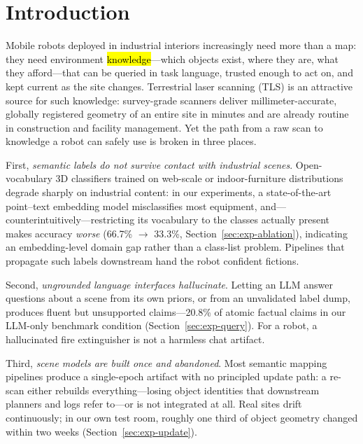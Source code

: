 \documentclass[electronics,article,accept,pdftex,moreauthors]{Definitions/mdpi}
\begin{document}
\section{Introduction}
\label{sec:introduction}

Mobile robots deployed in industrial interiors increasingly need more than a
map: they need environment \hl{knowledge}---which objects exist, where they
are, what they afford---that can be queried in task language, trusted enough
to act on, and kept current as the site changes. Terrestrial laser scanning
(TLS) is an attractive source for such knowledge: survey-grade scanners
deliver millimeter-accurate, globally registered geometry of an entire site
in minutes and are already routine in construction and facility management.
Yet the path from a raw scan to knowledge a robot can safely use is broken in
three places.%


First, \emph{{semantic labels do not survive contact with industrial scenes}}.
Open-vocabulary 3D classifiers trained on web-scale or indoor-furniture
distributions degrade sharply on industrial content: in our experiments, a
state-of-the-art point--text embedding model misclassifies most equipment,
and---counterintuitively---restricting its vocabulary to the classes actually
present makes accuracy \emph{worse} (66.7\% $\rightarrow$ 33.3\%,
Section~\ref{sec:exp-ablation}), indicating an embedding-level domain gap rather than a class-list
problem. Pipelines that propagate such labels downstream hand the robot
confident fictions.

Second, \emph{{ungrounded language interfaces hallucinate}}. Letting an LLM
answer questions about a scene from its own priors, or from an unvalidated
label dump, produces fluent but unsupported claims---20.8\% of atomic factual
claims in our LLM-only benchmark condition (Section~\ref{sec:exp-query}). For a robot, a
hallucinated fire extinguisher is not a harmless chat artifact.

Third, \emph{scene models are built once and abandoned}. Most semantic
mapping pipelines produce a single-epoch artifact with no principled update
path: a re-scan either rebuilds everything---losing object identities that
downstream planners and logs refer to---or is not integrated at all. Real
sites drift continuously; in our own test room, roughly one third of object
geometry changed within two weeks (Section~\ref{sec:exp-update}).
\end{document}
